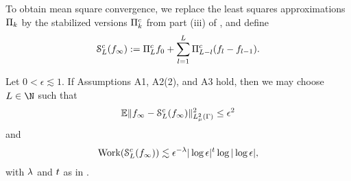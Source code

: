 To obtain mean square convergence, we replace the least squares approximations $\P_{k}$ by the stabilized versions $\P_k^{\cond}$ from part (iii) of , and define
\begin{equation}
\label{eq:ml2}
\smol^{\cond}_{L}(\rs_{\infty}):=
\P^{\cond}_{L}\rs_{0}+\sum_{l=1}^{L}\P^{\cond}_{L-l}(\rs_{l}-\rs_{l-1}).
\end{equation}
\begin{thm}
	\label{thm:main2}
	Let $0<\epsilon\lesssim 1$. If Assumptions A1, A2(2), and A3 hold, then we may choose $L\in\N$ such that  
		\begin{equation}
		\expect\norm{\rs_{\infty}-\smol^{\cond}_{L}(\rs_{\infty})}{L^2_{\measure}(\domPS)}^2\leq \epsilon^2
		\end{equation}
		and
	\begin{equation*}
	\begin{split}
	\work(\smol_{L}^{\cond}(\rs_{\infty}))\lesssim \epsilon^{-\rate}|\log \epsilon|^{\lrate}\log|\log\epsilon|,
	\end{split}
	\end{equation*}
	with $\rate$ and $\lrate$ as in .
\end{thm}
